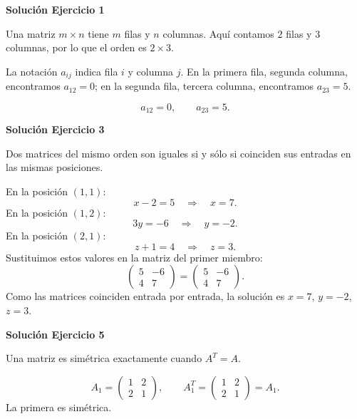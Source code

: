 \clearpage
{}\par
\bigskip
\par\bigskip\noindent\textbf{Solución Ejercicio 1}\par\nobreak
Una matriz $m\times n$ tiene $m$ filas y $n$ columnas. Aquí contamos $2$ filas y $3$ columnas, por lo que el orden es $\boxed{2\times3}$.

La notación $a_{ij}$ indica fila $i$ y columna $j$. En la primera fila, segunda columna, encontramos $a_{12}=0$; en la segunda fila, tercera columna, encontramos $a_{23}=5$.

\[
\boxed{a_{12}=0,\qquad a_{23}=5}.
\]

\par\bigskip\noindent\textbf{Solución Ejercicio 3}\par\nobreak
Dos matrices del mismo orden son iguales si y sólo si coinciden sus entradas en las mismas posiciones.

En la posición $(1,1)$:
\[
x - 2=5\quad\Longrightarrow\quad x=7.
\]
En la posición $(1,2)$:
\[
3 y=-6\quad\Longrightarrow\quad y=-2.
\]
En la posición $(2,1)$:
\[
z + 1=4\quad\Longrightarrow\quad z=3.
\]
Sustituimos estos valores en la matriz del primer miembro:
\[
\begin{pmatrix}5&-6\\4&7\end{pmatrix}=\begin{pmatrix}5&-6\\4&7\end{pmatrix}.
\]
Como las matrices coinciden entrada por entrada, la solución es $x=7$, $y=-2$, $z=3$.


\par\bigskip\noindent\textbf{Solución Ejercicio 5}\par\nobreak
Una matriz es simétrica exactamente cuando $A^T=A$.

\[
A_1=\begin{pmatrix}1&2\\2&1\end{pmatrix},\qquad A_1^T=\begin{pmatrix}1&2\\2&1\end{pmatrix}=A_1.
\]
La primera es simétrica.

